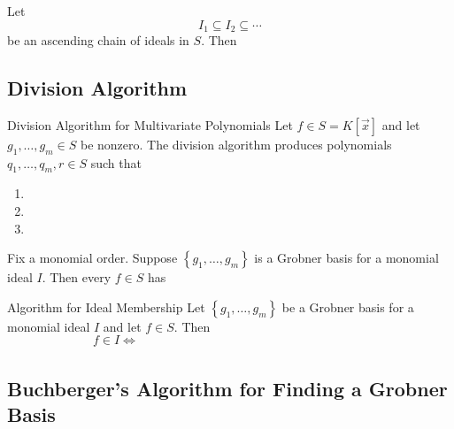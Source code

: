 \documentclass[11pt]{article}
\begin{document}
    \rruleline
    
    \begin{cor}{}
        Let
        \begin{equation*}
            I_1\subseteq I_2\subseteq\cdots
        \end{equation*}
        be an ascending chain of ideals in $S$. Then
    \end{cor}	
    
    \rruleline

    \subsection{Division Algorithm}

    \begin{theorem}{Division Algorithm for Multivariate Polynomials}
        Let $f\in S=K\left[ \vec{x} \right]$ and let $g_1,\ldots,g_m\in S$ be nonzero. The division algorithm produces polynomials $q_1,\ldots,q_m,r\in S$ such that
        \begin{enumerate}
            \item 
            \item 
            \item 
        \end{enumerate}
    \end{theorem}

    \rruleline

    \begin{theorem}{}
        Fix a monomial order. Suppose $\left\lbrace g_1,\ldots,g_m \right\rbrace$ is a Grobner basis for a monomial ideal $I$. Then every $f\in S$ has 
        \phantom{a unique remainder on division by $g_1,\ldots,g_m$}
    \end{theorem}

    \rruleline
    
    \begin{cor}{Algorithm for Ideal Membership}
        Let $\left\lbrace g_1,\ldots,g_m \right\rbrace$ be a Grobner basis for a monomial ideal $I$ and let $f\in S$. Then
        \begin{equation*}
            f\in I\iff\phantom{\text{$f$ has remainder $0$ on division by $g_1,\ldots,g_m$}}
        \end{equation*}
    \end{cor}	

    \rruleline
    
    \subsection{Buchberger's Algorithm for Finding a Grobner Basis}
    
\end{document}
